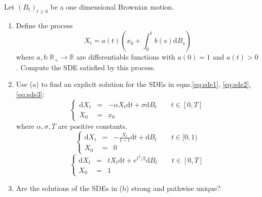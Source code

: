 \documentclass{article}
\newcommand{\mathd}{\mathrm{d}}
\newenvironment{enumeratealpha}{\begin{enumerate}[a{\textup{)}}] }{\end{enumerate}}
{\theorembodyfont{\rmfamily\small}\newtheorem{exercise}{Exercise}}
\begin{document}
\begin{exercise}
  [Pts 2+3+2] Let $(B_t)_{t \geqslant 0}$ be a one dimensional Brownian
  motion.
  \begin{enumeratealpha}
    \item Define the process
    \[ X_t = a (t) \left( x_0 + \int_0^t b (s) \mathd B_s \right) \]
    where $a, b : \mathbb{R}_+ \rightarrow \mathbb{R}$ are differentiable
    functions with $a (0) = 1$ and $a (t) > 0$. Compute the SDE satisfied by
    this process.
    
    \item Use (a) to find an explicit solution for the SDEs in
    eqns.{\eqref{eq:sde1}}, {\eqref{eq:sde2}}, {\eqref{eq:sde3}}:
    \begin{equation}
      \left\{\begin{array}{lll}
        \mathd X_t & = & - \alpha X_t \mathd t + \sigma \mathd B_t \qquad t
        \in [0, T]\\
        X_0 & = & x_0
      \end{array}\right. \label{eq:sde1}
    \end{equation}
    where $\alpha, \sigma, T$ are positive constants.
    \begin{equation}
      \left\{\begin{array}{lll}
        \mathd X_t & = & - \frac{X_t}{1 - t} \mathd t + \mathd B_t \qquad t
        \in [0, 1)\\
        X_0 & = & 0
      \end{array}\right. \label{eq:sde2}
    \end{equation}
    \begin{equation}
      \left\{\begin{array}{lll}
        \mathd X_t & = & t X_t \mathd t + e^{t^2 / 2} \mathd B_t \qquad t \in
        [0, T]\\
        X_0 & = & 1
      \end{array}\right. \label{eq:sde3}
    \end{equation}
    \item Are the solutions of the SDEs in (b) strong and pathwise unique?
  \end{enumeratealpha}
\end{exercise}

\
\end{document}
